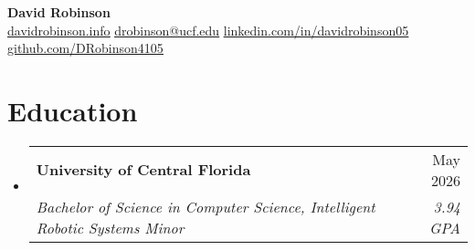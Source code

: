 \documentclass[letterpaper,11pt]{article}
\makeatletter
\newcommand{\resumeSubheading}[4]{
  \vspace{-2pt}\item
    \begin{tabular*}{0.97\textwidth}[t]{l@{\extracolsep{\fill}}r}
      \textbf{#1} & #2 \\
      \textit{\small#3} & \textit{\small #4} \\
    \end{tabular*}\vspace{-7pt}
}
\newcommand{\resumeSubHeadingListStart}{\begin{itemize}[leftmargin=0.15in, label={}]}
\newcommand{\resumeSubHeadingListEnd}{\end{itemize}}
\makeatother
\begin{document}
\begin{center}
  \textbf{\Huge David Robinson} \\ \vspace{2pt} \small
  \faCode\hspace{0.25pt} \href{https://www.davidrobinson.info/}{\uline{davidrobinson.info}}
  \faEnvelope\hspace{0.25pt} \href{mailto:drobinson@ucf.edu}{\uline{drobinson@ucf.edu}}
  \faLinkedin\hspace{0.25pt} \href{https://linkedin.com/in/davidrobinson05}{\uline{linkedin.com/in/davidrobinson05}}
  \faGithub\hspace{0.25pt} \href{https://github.com/DRobinson4105}{\uline{github.com/DRobinson4105}}
\end{center}

\section{Education}
  \resumeSubHeadingListStart
    \resumeSubheading
      {University of Central Florida}{May 2026}
      {Bachelor of Science in Computer Science, Intelligent Robotic Systems Minor}{3.94 GPA}
  \resumeSubHeadingListEnd
\end{document}
